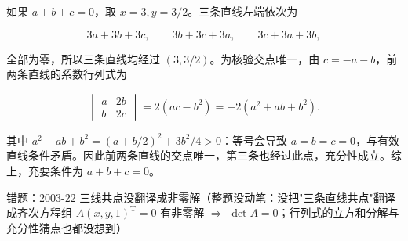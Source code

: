\documentclass[UTF8,11pt,fontset=windows]{ctexart}
\begin{document}
如果 $a+b+c=0$，取 $x=3,y=3/2$。三条直线左端依次为

$$
3a+3b+3c,
\qquad3b+3c+3a,
\qquad3c+3a+3b,
$$

全部为零，所以三条直线均经过 $(3,3/2)$。为核验交点唯一，由 $c=-a-b$，前两条直线的系数行列式为

$$
\begin{vmatrix}a&2b\\b&2c\end{vmatrix}
=2(ac-b^2)=-2(a^2+ab+b^2).
$$

其中 $a^2+ab+b^2=(a+b/2)^2+3b^2/4>0$：等号会导致 $a=b=c=0$，与有效直线条件矛盾。因此前两条直线的交点唯一，第三条也经过此点，充分性成立。综上，充要条件为 $\boxed{a+b+c=0}$。

\begingroup\color{gray}错题：2003-22 三线共点没翻译成非零解（整题没动笔：没把"三条直线共点"翻译成齐次方程组 $A(x,y,1)^{\mathrm T}=0$ 有非零解 $\Rightarrow$ $\det A=0$；行列式的立方和分解与充分性猜点也都没想到）\par\endgroup
\end{document}
